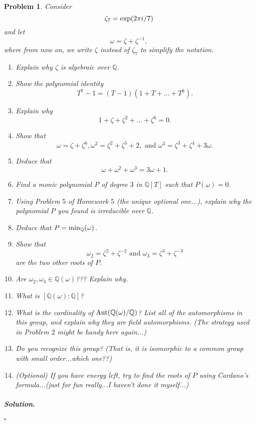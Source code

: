 \documentclass[reqno]{amsart}
\theoremstyle{plain}
\newtheorem{problem}{Problem}
\theoremstyle{definition}
\newenvironment{solution}{\paragraph{\emph{Solution}.}}{\hfill$\square$}
\begin{document}
\begin{problem}
Consider 
$$\zeta_{7} = {\rm exp}(2 \pi i/7) $$
and let
$$\omega = \zeta + \zeta^{-1}, $$
where from now on, we write $\zeta$ instead of $\zeta_{7}$ to simplify the notation.  
\begin{enumerate}
\item Explain why $\zeta$ is algebraic over $\mathbb{Q}$.
\item Show the polynomial identity
$$T^{7} - 1 = (T - 1)(1 + T + \ldots + T^{6}). $$
\item Explain why
$$1 + \zeta + \zeta^{2} + \ldots + \zeta^{6} = 0. $$
\item Show that
$$\omega = \zeta + \zeta^{6}, \omega^{2} = \zeta^{2} + \zeta^{5} + 2, \text{ and } \omega^{3} = \zeta^{3} + \zeta^{4} + 3\omega. $$
\item Deduce that
$$\omega + \omega^{2} + \omega^{3} = 3\omega + 1. $$
\item Find a monic polynomial $P$ of degree $3$ in $\mathbb{Q}[T]$ such that $P(\omega) = 0$.
\item Using Problem $5$ of Homework $5$ (the unique optional one...), explain why the polynomial $P$ you found is irreducible over $\mathbb{Q}$. 
\item Deduce that $P = {\rm min}_{\mathbb{Q}}(\omega)$.
\item Show that
$$\omega_{2} = \zeta^{2} + \zeta^{-2} \text{ and } \omega_{3} = \zeta^{3} + \zeta^{-3} $$
are the two other roots of $P$.
\item Are $\omega_{2}, \omega_{3} \in \mathbb{Q}(\omega)$???  Explain why.
\item What is $[\mathbb{Q}(\omega):\mathbb{Q}]$? 
\item What is the cardinality of ${\rm Aut}(\mathbb{Q}(\omega)/\mathbb{Q})$?  List all of the automorphisms in this group, and explain why they are field automorphisms.  (The strategy used in Problem $2$ might be handy here again...)
\item Do you recognize this group?  (That is, it is isomorphic to a common group with small order...which one??)
\item (Optional)  If you have energy left, try to find the roots of $P$ using Cardano's formula...(just for fun really...I haven't done it myself...)
\end{enumerate}
\end{problem}

\begin{solution}

\end{solution}
\end{document}

